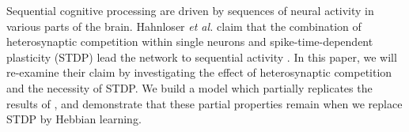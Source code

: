 Sequential cognitive processing are driven by sequences of neural activity in various parts of the brain. 
Hahnloser \textit{et al.} claim that the combination of heterosynaptic competition within single neurons and spike-time-dependent plasticity (STDP) lead the network to sequential activity \cite{Fiete}. In this paper, we will re-examine their claim by investigating the effect of heterosynaptic competition and the necessity of STDP. We build a model which partially replicates the results of \cite{Fiete}, and demonstrate that these partial properties remain when we replace STDP by Hebbian learning.
